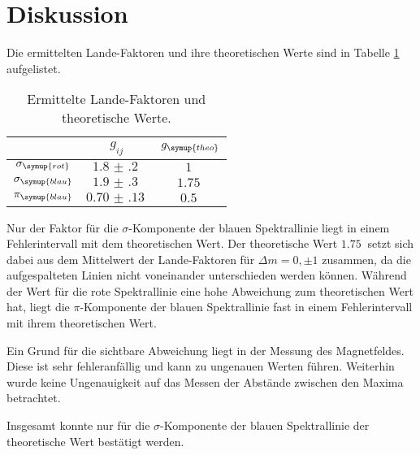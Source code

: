 \section{Diskussion}
\label{sec:Diskussion}

Die ermittelten Lande-Faktoren und ihre theoretischen Werte sind in Tabelle \ref{tab:lande} aufgelistet.

\begin{table}
  \centering
  \begin{tabular}{c c c}
    \toprule
     & $g_{ij}$ & $g_{\symup{theo}}$\\
    \midrule
        $\sigma_{\symup{rot}}$   &   $\SI{1.8(2)}{}$    & $\SI{1}{}$  \\
        $\sigma_{\symup{blau}}$  &   $\SI{1.9(3)}{}$    & $\SI{1.75}{}$  \\
        $\pi_{\symup{blau}}$     &   $\SI{0.70(13)}{}$  & $\SI{0.5}{}$  \\
    \bottomrule
  \end{tabular}
  \caption{Ermittelte Lande-Faktoren und theoretische Werte.}
  \label{tab:lande}
\end{table}

Nur der Faktor für die $\sigma$-Komponente der blauen Spektrallinie liegt in einem Fehlerintervall mit dem theoretischen Wert.
Der theoretische Wert $\SI{1.75}{}$ setzt sich dabei aus dem Mittelwert der Lande-Faktoren für $\Delta m= 0,\pm1$ zusammen, da die
aufgespalteten Linien nicht voneinander unterschieden werden können. Während der Wert für die rote Spektrallinie eine hohe Abweichung
zum theoretischen Wert hat, liegt die $\pi$-Komponente der blauen Spektrallinie fast in einem Fehlerintervall mit ihrem theoretischen Wert.

Ein Grund für die sichtbare Abweichung liegt in der Messung des Magnetfeldes. Diese ist sehr fehleranfällig
und kann zu ungenauen Werten führen. Weiterhin wurde keine Ungenauigkeit auf das Messen der Abstände zwischen den Maxima
betrachtet. 

Insgesamt konnte nur für die $\sigma$-Komponente der blauen Spektrallinie der theoretische Wert bestätigt werden.